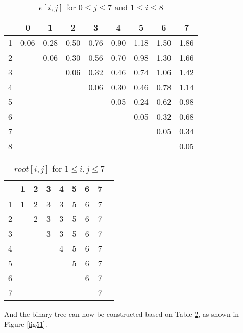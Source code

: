 \begin{table}[H]\centering
\begin{tabular}{c c c c c c c c c}
  & 0    & 1    & 2    & 3    & 4    & 5    & 6    & 7\\\hline
1 & 0.06 & 0.28 & 0.50 & 0.76 & 0.90 & 1.18 & 1.50 & 1.86\\
2 &      & 0.06 & 0.30 & 0.56 & 0.70 & 0.98 & 1.30 & 1.66\\
3 &      &      & 0.06 & 0.32 & 0.46 & 0.74 & 1.06 & 1.42\\
4 &      &      &      & 0.06 & 0.30 & 0.46 & 0.78 & 1.14\\
5 &      &      &      &      & 0.05 & 0.24 & 0.62 & 0.98\\
6 &      &      &      &      &      & 0.05 & 0.32 & 0.68\\
7 &      &      &      &      &      &      & 0.05 & 0.34\\
8 &      &      &      &      &      &      &      & 0.05\\\hline
\end{tabular}
\caption{$e[i,j]$ for $0 \leq j \leq 7$ and $1 \leq i \leq 8$}\label{tab53}
\end{table}

\begin{table}[H]\centering
\begin{tabular}{c c c c c c c c c}
  & 1    & 2    & 3 & 4 & 5 & 6 & 7\\\hline
1 & 1 & 2 & 3 & 3 & 5 & 6 & 7\\
2 &   & 2 & 3 & 3 & 5 & 6 & 7\\
3 &   &   & 3 & 3 & 5 & 6 & 7\\
4 &   &   &   & 4 & 5 & 6 & 7\\
5 &   &   &   &   & 5 & 6 & 7\\
6 &   &   &   &   &   & 6 & 7\\
7 &   &   &   &   &   &   & 7\\\hline
\end{tabular}
\caption{$root[i,j]$ for $1 \leq i,j \leq 7$}\label{tab54}
\end{table}

And the binary tree can now be constructed based on Table \ref{tab54}, as shown in Figure \ref{fig51}.

